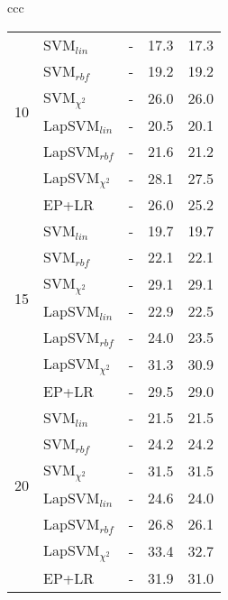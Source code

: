 \documentclass[journal,11pt]{IEEEtran}
\begin{document}
\begin{center}
{\begin{tabular}{ccc}
\begin{tabular}{|r|l|rrr|}
\hline
\multirow{6}{*}{10}
& SVM$_{lin}$ 	 		& - & 17.3 & 17.3 \\
& SVM$_{rbf}$ 	 		& - & 19.2 & 19.2 \\
& SVM$_{\chi^2}$ 		& - & 26.0 & 26.0 \\
& LapSVM$_{lin}$ 	 	& - & 20.5 & 20.1 \\
& LapSVM$_{rbf}$ 	 	& - & 21.6 & 21.2 \\
& LapSVM$_{\chi^2}$ & - & 28.1 & 27.5 \\
& EP+LR							& - & 26.0 & 25.2 \\
\hline
\multirow{6}{*}{15}
& SVM$_{lin}$ 	 		& - & 19.7 & 19.7 \\
& SVM$_{rbf}$ 	 		& - & 22.1 & 22.1 \\
& SVM$_{\chi^2}$ 		& - & 29.1 & 29.1 \\
& LapSVM$_{lin}$ 	 	& - & 22.9 & 22.5 \\
& LapSVM$_{rbf}$ 	 	& - & 24.0 & 23.5 \\
& LapSVM$_{\chi^2}$ & - & 31.3 & 30.9 \\
& EP+LR							& - & 29.5 & 29.0 \\
\hline
\multirow{6}{*}{20}
& SVM$_{lin}$ 	 		& - & 21.5 & 21.5 \\
& SVM$_{rbf}$ 	 		& - & 24.2 & 24.2 \\
& SVM$_{\chi^2}$ 		& - & 31.5 & 31.5 \\
& LapSVM$_{lin}$ 	 	& - & 24.6 & 24.0 \\
& LapSVM$_{rbf}$ 	 	& - & 26.8 & 26.1 \\
& LapSVM$_{\chi^2}$ & - & 33.4 & 32.7 \\
& EP+LR							& - & 31.9 & 31.0 \\
\hline
\end{tabular}


\\
\end{tabular}

}
\end{center}
\end{document}
